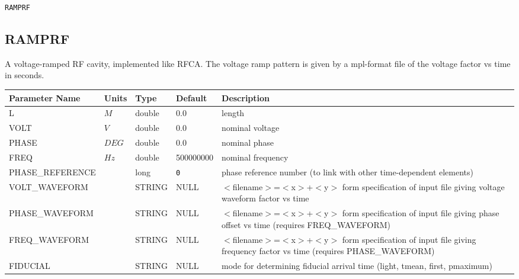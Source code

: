\begin{latexonly}
\newpage
\begin{center}{\Large\verb|RAMPRF|}\end{center}
\end{latexonly}\subsection{RAMPRF}
A voltage-ramped RF cavity, implemented like RFCA.  The voltage ramp pattern is
given by a mpl-format file of the voltage factor vs time in seconds.
\\
\begin{tabular}{|l|l|l|l|p{\descwidth}|} \hline
Parameter Name & Units & Type & Default & Description \\ \hline 
L & $M$ & double &  0.0 & length  \\ \hline 
VOLT & $V$ & double &  0.0 & nominal voltage  \\ \hline 
PHASE & $DEG$ & double &  0.0 & nominal phase  \\ \hline 
FREQ & $Hz$ & double &   500000000 & nominal frequency  \\ \hline 
PHASE\_REFERENCE &  & long &  \verb|0| & phase reference number (to link with other time-dependent elements)  \\ \hline 
VOLT\_WAVEFORM &  & STRING &   NULL            & $<$filename$>$=$<$x$>$+$<$y$>$ form specification of input file giving voltage waveform factor vs time  \\ \hline 
PHASE\_WAVEFORM &  & STRING &   NULL            & $<$filename$>$=$<$x$>$+$<$y$>$ form specification of input file giving phase offset vs time (requires FREQ\_WAVEFORM)  \\ \hline 
FREQ\_WAVEFORM &  & STRING &   NULL            & $<$filename$>$=$<$x$>$+$<$y$>$ form specification of input file giving frequency factor vs time (requires PHASE\_WAVEFORM)  \\ \hline 
FIDUCIAL &  & STRING &   NULL            & mode for determining fiducial arrival time (light, tmean, first, pmaximum)  \\ \hline 
\end{tabular}


